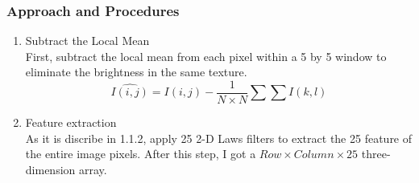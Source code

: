 \documentclass[11pt]{article}
\begin{document}
\subsubsection{Approach and Procedures}
\begin{enumerate}

\item Subtract the Local Mean\\
First, subtract the local mean from each pixel within a 5 by 5 window to eliminate the brightness in the same texture. 
\begin{equation}
\hat { I(i,j) } =I(i,j)-\frac { 1 }{ N\times N } \sum { \sum { I(k,l) }  } 
\end{equation}
\item Feature extraction\\
As it is discribe in 1.1.2, apply 25 2-D Laws filters to extract the 25 feature of the entire image pixels. After this step, I got a $Row \times Column \times 25$ three-dimension array. 
	
\begin{figure}[!htbp]
	\centering    
	 

\end{figure}
\end{enumerate}
\end{document}
